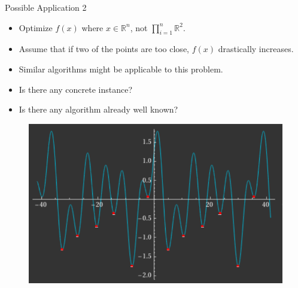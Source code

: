 \documentclass[13pt,aspectratio=169,table,dvipdfmx]{beamer}
\begin{document}
    \begin{frame}{Possible Application 2}
        \begin{itemize}
            \item Optimize $f(x)$ where $x \in \mathbb{R}^{n}$, not $\prod_{i=1}^{n} \mathbb{R}^2$.
            \item Assume that if two of the points are too close, $f(x)$ drastically increases.
            \item Similar algorithms might be applicable to this problem.
            \item Is there any concrete instance?
            \item Is there any algorithm already well known?
        \end{itemize}
        \begin{figure}[htbp]
            \centering
            \includegraphics[width=0.5\columnwidth]{imgs/applicatoin1d.png}
        \end{figure}
    \end{frame}
\end{document}
